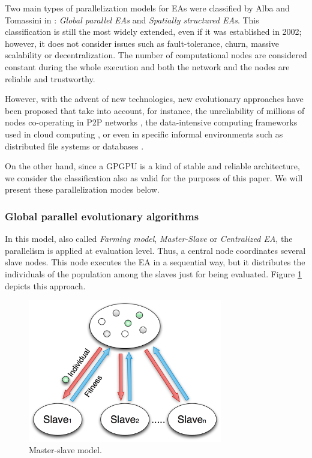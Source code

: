 \documentclass{article}
\begin{document}
Two main types of parallelization models for EAs were classified by Alba and Tomassini in \cite{Alba02Parallelism}: \textit{Global parallel EAs} and
\textit{Spatially structured EAs}. This classification is still the
most widely extended, even if it was established in 2002; however, it
does not consider issues such as fault-tolerance, churn, massive
scalability or decentralization. The number of computational nodes are
considered constant during the whole execution and both the network
and the nodes are reliable and trustworthy.

However, with the advent of new technologies, new evolutionary approaches have been proposed that take into account, for instance, the unreliability of millions of nodes co-operating in P2P networks \cite{laredo2010evag}, the data-intensive computing frameworks used in cloud computing \cite{VermaCloud10}, or even in specific informal environments such as distributed file systems or databases \cite{Meri_CloudEA13,Merelo_Couch13}.

On the other hand, since a GPGPU is a kind of
stable and reliable architecture, we consider the classification also
as valid for the purposes of this paper. We will present these
parallelization modes below.

\subsubsection{Global parallel evolutionary algorithms}
In this model, also called \textit{Farming model},
\textit{Master-Slave} or \textit{Centralized EA}, the parallelism is
applied at evaluation level. Thus, a central node coordinates several
slave nodes. This node executes the EA in a sequential way, but it
distributes the individuals of the population among the slaves just
for being evaluated. Figure \ref{fig:serverClient} depicts this
approach.

\begin{figure}[tb]
\centering
\includegraphics[width=20pc]{serverClient}
\caption{Master-slave model.}
\label{fig:serverClient}
\end{figure}
\end{document}
